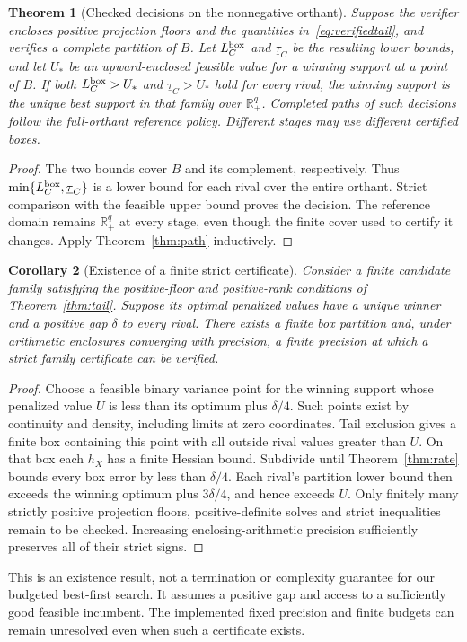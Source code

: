 \documentclass[preprint,11pt,numbers]{elsarticle}
\newtheorem{theorem}{Theorem}
\newtheorem{corollary}[theorem]{Corollary}
\theoremstyle{remark}\newtheorem{remark}[theorem]{Remark}
\newcommand{\R}{\mathbb R}
\begin{document}
\begin{theorem}[Checked decisions on the nonnegative orthant]\label{thm:global}
Suppose the verifier encloses positive projection floors and the quantities
in~\eqref{eq:verifiedtail}, and verifies a complete partition of $B$. Let
$L_C^{\rm box}$ and $\underline\tau_C$ be the resulting lower bounds, and let
$U_*$ be an upward-enclosed feasible value for a winning support at a point of $B$.
If both $L_C^{\rm box}>U_*$ and $\underline\tau_C>U_*$ hold for every rival,
the winning support is the unique best support in that family over $\R_+^q$.
Completed paths of such decisions follow the full-orthant reference policy.
Different stages may use different certified boxes.
\end{theorem}
\begin{proof}
The two bounds cover $B$ and its complement, respectively. Thus
$\min\{L_C^{\rm box},\underline\tau_C\}$ is a lower bound for each rival over
the entire orthant. Strict comparison with the feasible upper bound proves the
decision. The reference domain remains $\R_+^q$ at every stage, even though the
finite cover used to certify it changes. Apply Theorem~\ref{thm:path} inductively.
\end{proof}


\begin{corollary}[Existence of a finite strict certificate]\label{cor:finite}
Consider a finite candidate family satisfying the positive-floor and positive-rank
conditions of Theorem~\ref{thm:tail}. Suppose its optimal penalized values have a
unique winner and a positive gap $\delta$ to every rival. There exists a finite
box partition and, under arithmetic enclosures converging with precision, a
finite precision at which a strict family certificate can be verified.
\end{corollary}
\begin{proof}
Choose a feasible binary variance point for the winning support whose penalized
value $U$ is less than its optimum plus $\delta/4$. Such points exist by
continuity and density, including limits at zero coordinates. Tail exclusion
gives a finite box containing this point with all outside rival values greater
than $U$. On that box each $h_X$ has a finite Hessian bound. Subdivide until
Theorem~\ref{thm:rate} bounds every box error by less than $\delta/4$.
Each rival's partition lower bound then exceeds the winning optimum plus
$3\delta/4$, and hence exceeds $U$. Only finitely many strictly positive
projection floors, positive-definite solves and strict inequalities remain to
be checked. Increasing enclosing-arithmetic precision sufficiently preserves
all of their strict signs.
\end{proof}
This is an existence result, not a termination or complexity guarantee for
our budgeted best-first search. It assumes a positive gap and access to a
sufficiently good feasible incumbent. The implemented fixed precision and
finite budgets can remain unresolved even when such a certificate exists.
\end{document}
